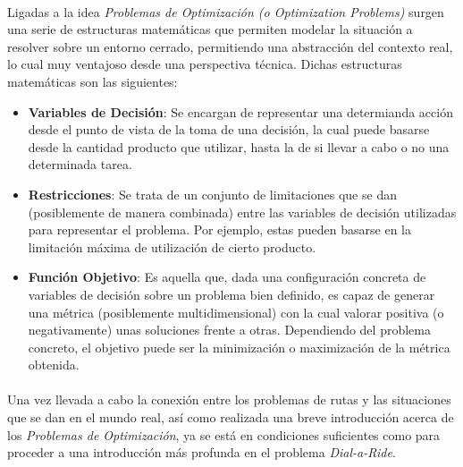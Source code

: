 \documentclass{subfiles}
\begin{document}
      \paragraph{}
      Ligadas a la idea \emph{Problemas de Optimización (o Optimization Problems)} surgen una serie de estructuras matemáticas que permiten modelar la situación a resolver sobre un entorno cerrado, permitiendo una abstracción del contexto real, lo cual muy ventajoso desde una perspectiva técnica. Dichas estructuras matemáticas son las siguientes:
      \begin{itemize}

        \item \textbf{Variables de Decisión}: Se encargan de representar una determianda acción desde el punto de vista de la toma de una decisión, la cual puede basarse desde la cantidad producto que utilizar, hasta la de si llevar a cabo o no una determinada tarea.

        \item \textbf{Restricciones}: Se trata de un conjunto de limitaciones que se dan (posiblemente de manera combinada) entre las variables de decisión utilizadas para representar el problema. Por ejemplo, estas pueden basarse en la limitación máxima de utilización de cierto producto.

        \item \textbf{Función Objetivo}: Es aquella que, dada una configuración concreta de variables de decisión sobre un problema bien definido, es capaz de generar una métrica (posiblemente multidimensional) con la cual valorar positiva (o negativamente) unas soluciones frente a otras. Dependiendo del problema concreto, el objetivo puede ser la minimización o maximización de la métrica obtenida.

      \end{itemize}

      \paragraph{}
      Una vez llevada a cabo la conexión entre los problemas de rutas y las situaciones que se dan en el mundo real, así como realizada una breve introducción acerca de los \emph{Problemas de Optimización}, ya se está en condiciones suficientes como para proceder a una introducción más profunda en el problema \emph{Dial-a-Ride}.
\end{document}
